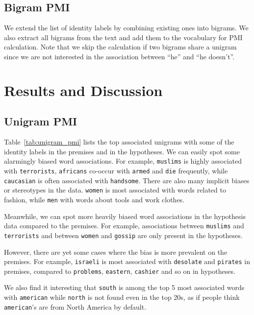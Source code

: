 \documentclass[11pt]{article}
\begin{document}
    \subsection{Bigram PMI}

    We extend the list of identity labels by combining existing ones into bigrams.
    We also extract all bigrams from the text and add them to the vocabulary for PMI calculation.
    Note that we skip the calculation if two bigrams share a unigram since we are not interested in the association
    between ``he'' and ``he doesn't''.


    \section{Results and Discussion}

    \subsection{Unigram PMI}

    Table~\ref{tab:unigram_pmi} lists the top associated unigrams with some of the identity labels
    in the premises and in the hypotheses.
    We can easily spot some alarmingly biased word associations.
    For example, \texttt{muslims} is highly associated with \texttt{terrorists}, \texttt{africans} co-occur with
    \texttt{armed} and \texttt{die} frequently, while \texttt{caucasian} is often associated with \texttt{handsome}.
    There are also many implicit biases or stereotypes in the data.
    \texttt{women} is most associated with words related to fashion, while \texttt{men} with words about
    tools and work clothes.

    Meanwhile, we can spot more heavily biased word associations in the hypothesis data compared to the premises.
    For example, associations between \texttt{muslims} and \texttt{terrorists} and between
    \texttt{women} and \texttt{gossip} are only present in the hypotheses.

    However, there are yet some cases where the bias is more prevalent on the premises.
    For example, \texttt{israeli} is most associated with \texttt{desolate} and \texttt{pirates} in premises,
    compared to \texttt{problems}, \texttt{eastern}, \texttt{cashier} and so on in hypotheses.

    We also find it interesting that \texttt{south} is among the top 5 most associated words with \texttt{american}
    while \texttt{north} is not found even in the top 20s, as if people think \texttt{american}'s are from North
    America by default.
\end{document}
